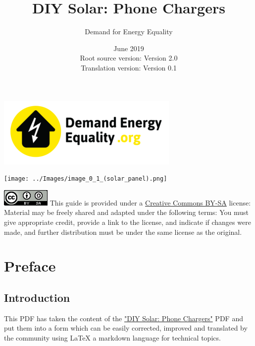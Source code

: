 \documentclass{article}
\title{DIY Solar: Phone Chargers}
\author{Demand for Energy Equality}
\date{June 2019 \\ Root source version: Version 2.0 \\ Translation version: Version 0.1}
\theoremstyle{definition}
\theoremstyle{definition}
\theoremstyle{remark}
\begin{document}
 
\maketitle{}

\begin{center}
  \includegraphics[width=0.25\paperwidth]{../Images/image_0_0_(demand_energy_equality).png}
\end{center}

\begin{center}
  \texttt{[image: ../Images/image\_0\_1\_(solar\_panel).png]}
\end{center}

\vfill
  
\includegraphics[]{../Images/image_0_2_(license).png} \newline
This guide is provided under a \href{https://creativecommons.org/licenses/by-sa/4.0/legalcode}{Creative Commons BY-SA} license: \newline
Material may be freely shared and adapted under the following terms: You must give appropriate credit, provide a link to the license, and indicate if changes were made, and further distribution must be under the same license as the original.

\newpage

\tableofcontents

\newpage

{\color{blue}\section{Preface}} %
\label{sec:preface}

  {\color{blue}\subsection*{Introduction}} %
  \label{sub:introduction}
  
    This PDF has taken the content of the \href{https://www.demandenergyequality.org/build-your-own-panels}{"DIY Solar: Phone Chargers"} PDF and put them into a form which can be easily corrected, improved and translated by the community using LaTeX a markdown language for technical topics.
\end{document}
